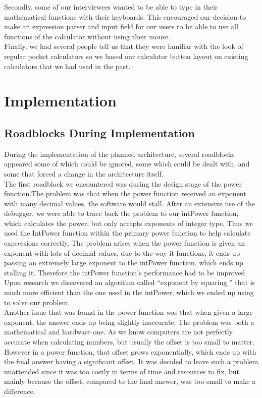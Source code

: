 \documentclass[a4paper, 12pt]{article}
\begin{document}
\vspace{5mm}

Secondly, some of our interviewees wanted to be able to type in their mathematical functions with their keyboards. This encouraged our decision to make an expression parser and input field for our users to be able to use all functions of the calculator without using their mouse. 
\\

Finally, we had several people tell us that they were familiar with the look of regular pocket calculators so we based our calculator button layout on existing calculators that we had used in the past.





\section{Implementation}

\subsection{Roadblocks During Implementation}

During the implementation of the planned architecture, several roadblocks appeared some of which could be ignored, some which could be dealt with, and some that forced a change in the architecture itself.
\\

The first roadblock we encountered was during the design stage of the power function.The problem was that when the power function received an exponent with many decimal values, the software would stall. After an extensive use of the debugger, we were able to trace back the problem to our  intPower function, which calculates the power, but only accepts exponents of integer type. Thus we used the IntPower function within the primary power function to help calculate expressions correctly. The problem arises when the power function is given an exponent with lots of decimal values, due to the way it functions, it ends up passing an extremely large exponent to the intPower function, which ends up stalling it. Therefore the intPower function’s performance had to be improved. Upon research we discovered an algorithm called “exponent by squaring ”  that is much more efficient than the one used in the intPower, which we ended up using to solve our problem.
\\

Another issue that was found in the power function was that when given a large exponent, the answer ends up being slightly inaccurate. The problem was both a mathematical and hardware one. As we know computers are not perfectly accurate when calculating numbers, but usually the offset is too small to matter. However in a power function, that offset grows exponentially, which ends up with the final answer having a significant offset. It was decided to leave such a problem unattended since it was too costly in terms of time and resources to fix, but mainly because the offset, compared to the final answer, was too small to make a difference.
\\
\end{document}
